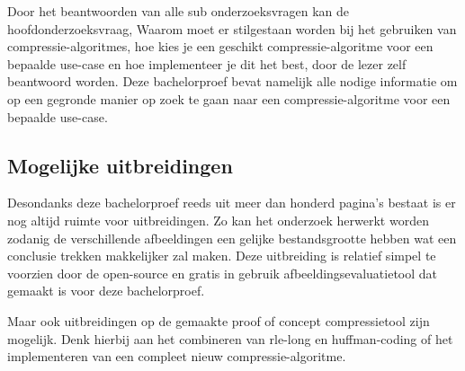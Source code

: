 Door het beantwoorden van alle sub onderzoeksvragen kan de hoofdonderzoeksvraag, Waarom moet er stilgestaan worden bij het gebruiken van \glspl{compressie-algoritme}, hoe kies je een geschikt \gls{compressie-algoritme} voor een bepaalde \gls{use-case} en hoe implementeer je dit het best, door de lezer zelf beantwoord worden. Deze bachelorproef bevat namelijk alle nodige informatie om op een gegronde manier op zoek te gaan naar een \gls{compressie-algoritme} voor een bepaalde \gls{use-case}.

\subsection{Mogelijke uitbreidingen}
\label{sec:conclussie-uitbreidingen}

Desondanks deze bachelorproef reeds uit meer dan honderd pagina's bestaat is er nog altijd ruimte voor uitbreidingen. Zo kan het onderzoek herwerkt worden zodanig de verschillende afbeeldingen een gelijke bestandsgrootte hebben wat een conclusie trekken makkelijker zal maken. Deze uitbreiding is relatief simpel te voorzien door de \gls{open-source} en gratis in gebruik \gls{afbeeldingsevaluatietool} dat gemaakt is voor deze bachelorproef.

Maar ook uitbreidingen op de gemaakte proof of concept \gls{compressietool} zijn mogelijk. Denk hierbij aan het combineren van \gls{rle-long} en \gls{huffman-coding} of het implementeren van een compleet nieuw \gls{compressie-algoritme}.

